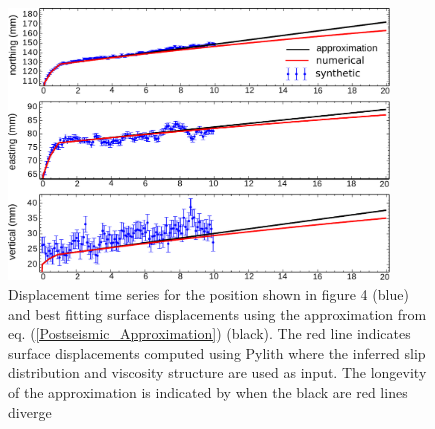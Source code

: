 \documentclass[12pt]{article}
\begin{document}
\begin{figure}[h!]\label{figure5}
  \centering
  \includegraphics[width=0.9\textwidth]{FinalFigures/Figure5.pdf}
  \caption{Displacement time series for the position shown in figure 4
    (blue) and best fitting surface displacements using the
    approximation from eq. (\ref{Postseismic_Approximation}) (black).
    The red line indicates surface displacements computed using Pylith
    where the inferred slip distribution and viscosity structure are
    used as input.  The longevity of the approximation is
    indicated by when the black are red lines diverge}
  \label{figure 5}
\end{figure}

\end{document}
